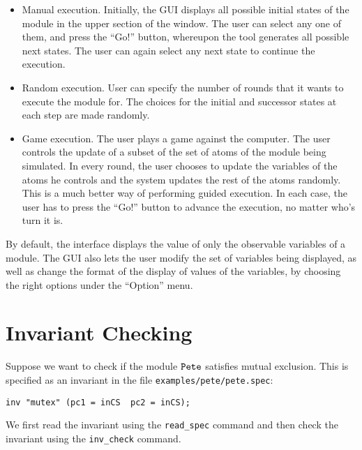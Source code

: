 \begin{itemize}
\item Manual execution. Initially, the GUI displays all possible
initial states of the module in the upper section of the window. The
user can select any one of them, and press the ``Go!'' button, 
whereupon the tool generates all possible next states. The user can
again select any next state to continue the execution.

\item Random execution. User can specify the number of rounds that it
wants to execute the module for. The choices for the initial and
successor states at each step are made randomly.

\item Game execution. The user plays a game against the computer. The
user controls the update of a subset of the set of atoms of the module
being simulated. In every round, the user chooses to update the
variables of the atoms he controls and the system updates the rest of
the atoms randomly. This is a much better way of performing guided
execution. In each case, the user has to press the ``Go!'' button to
advance the execution, no matter who's turn it is. 
\end{itemize}


\mypar
By default, the interface displays the value of only the observable
variables of a module. The GUI also lets the user modify the set of
variables being displayed, as well as change the format of the display
of values of the variables, by choosing the right options under the
``Option'' menu. 


\section{Invariant Checking}
Suppose we want to check if the module $\mbox{\tt Pete}$ satisfies mutual exclusion.
This is specified as an invariant in the file 
{\tt examples/pete/pete.spec}:

\begin{center}
\tt inv "mutex" \NOT(pc1 = inCS \AND\ pc2 = inCS);
\end{center}

\mypar
We first read the invariant using the 
{\tt read\_spec} command and then check the invariant using the
{\tt inv\_check} command.

